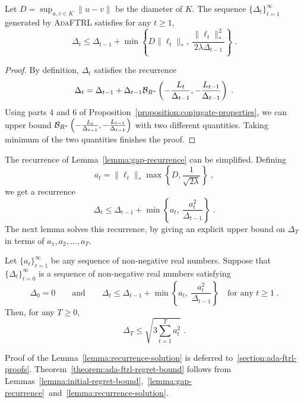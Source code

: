 \begin{lemma}[Recurrence]
\label{lemma:gap-recurrence}
Let $D = \sup_{u, v \in K} \|u -v\|$ be the diameter of $K$.  The sequence
$\{\Delta_t\}_{t=1}^\infty$ generated by \textsc{AdaFTRL} satisfies for any $t
\ge 1$,
$$
\Delta_t \le \Delta_{t-1} + \min \left\{ D\|\ell_t\|_*, \ \frac{\|\ell_t\|_*^2}{2\lambda \Delta_{t-1}} \right\} \; .
$$
\end{lemma}

\begin{proof}
By definition, $\Delta_t$ satisfies the recurrence
$$
\Delta_t = \Delta_{t-1} + \Delta_{t-1} \mathcal{B}_{R^*}\left( - \frac{L_t}{\Delta_{t-1}}, - \frac{L_{t-1}}{\Delta_{t-1}} \right) \; .
$$
Using parts 4 and 6 of Proposition~\ref{proposition:conjugate-properties}, we
can upper bound $\mathcal{B}_{R^*}\left( - \frac{L_t}{\Delta_{t-1}}, -
\frac{L_{t-1}}{\Delta_{t-1}} \right)$ with two different quantities.  Taking
minimum of the two quantities finishes the proof.
\end{proof}

The recurrence of Lemma~\ref{lemma:gap-recurrence} can be simplified. Defining
$$
a_t = \|\ell_t\|_* \max \left\{D, \frac{1}{\sqrt{2 \lambda}} \right\} \; ,
$$
we get a recurrence
$$
\Delta_t \le \Delta_{t-1} + \min \left\{ a_t, \ \frac{a_t^2}{\Delta_{t-1}} \right\} \; .
$$
The next lemma solves this recurrence, by giving an explicit upper bound on
$\Delta_T$ in terms of $a_1, a_2, \dots, a_T$.

\begin{lemma}[Recurrence]
\label{lemma:recurrence-solution}
Let $\{a_t\}_{t=1}^\infty$ be any sequence of non-negative real numbers.
Suppose that $\{\Delta_t\}_{t=0}^\infty$ is a sequence of non-negative real
numbers satisfying
$$
\Delta_0 = 0 \qquad \text{and} \qquad
\Delta_t \le \Delta_{t-1} + \min \left\{ a_t, \ \frac{a_t^2}{\Delta_{t-1}} \right\} \quad \text{for any $t \ge 1$} \; .
$$
Then, for any $T \ge 0$,
$$
\Delta_T \le \sqrt{3 \sum_{t=1}^T a_t^2} \; .
$$
\end{lemma}
%
Proof of the Lemma~\ref{lemma:recurrence-solution} is deferred
to~\ref{section:ada-ftrl-proofs}.  Theorem~\ref{theorem:ada-ftrl-regret-bound}
follows from
Lemmas~\ref{lemma:initial-regret-bound},~\ref{lemma:gap-recurrence}~and~\ref{lemma:recurrence-solution}.
